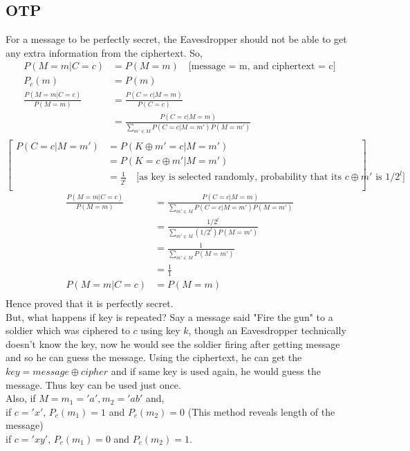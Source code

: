 \documentclass[english, 11pt]{article}
\begin{document}
\subsection*{OTP}
For a message to be perfectly secret, the Eavesdropper should not be able to get any extra information from the ciphertext. So, \\
\begin{align*}
  P(M=m|C=c) &= P(M=m) \quad \text{[message = m, and ciphertext = c]} \\
  P_c(m) &= P(m) \\
  \frac{P(M=m|C=c)}{P(M=m)} &= \frac{P(C=c|M=m)}{P(C=c)} \\
  &= \frac{P(C=c|M=m)}{\sum_{m' \in M} P(C=c|M=m')P(M=m')} \\
\end{align*}
\[
\left[
\begin{aligned}
  P(C=c|M=m') &= P(K \oplus m' = c | M = m') \\
  &= P(K = c \oplus m'  | M = m') \\
  &= \frac{1}{2^l} \quad \text{[as key is selected randomly, probability that its $c \oplus m'$ is $1/2^l$]} \\
\end{aligned}
\right]
\]
\begin{align*}
  \frac{P(M=m|C=c)}{P(M=m)} &= \frac{P(C=c|M=m)}{\sum_{m' \in M} P(C=c|M=m')P(M=m')} \\
  &= \frac{1/2^l}{\sum_{m' \in M} (1/2^l)P(M=m')} \\
  &= \frac{1}{\sum_{m' \in M} P(M=m')} \\
  &= \frac{1}{1} \\
  P(M=m|C=c) &= P(M=m) \\
\end{align*}
Hence proved that it is perfectly secret. \\
But, what happens if key is repeated? Say a message said "Fire the gun" to a soldier which was ciphered to $c$ using key $k$, though an Eavesdropper technically doesn't know the key, now he would see the soldier firing after getting message and so he can guess the message.
Using the ciphertext, he can get the $key = message \oplus cipher$ and if same key is used again, he would guess the message. Thus key can be used just once.\\
Also, if $M = {m_1='a',m_2='ab'}$ and,\\
if $c='x'$, $P_c(m_1) = 1$ and $P_c(m_2) = 0$ (This method reveals length of the message) \\
if $c='xy'$, $P_c(m_1) = 0$ and $P_c(m_2) = 1$.
\end{document}
